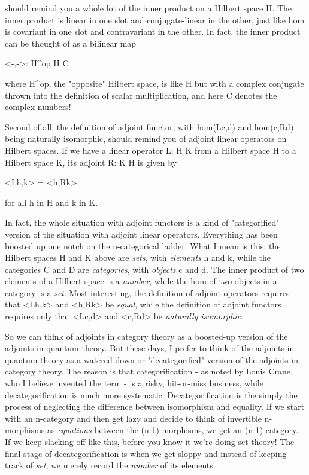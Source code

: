 should remind you a whole lot of the inner product on a Hilbert space
H.  The inner product is linear in one slot and conjugate-linear in the
other, just like hom is covariant in one slot and contravariant in the other.
In fact, the inner product can be thought of as a bilinear map

<-,->: H^{op} \times  H \to  C

where H^{op}, the "opposite" Hilbert space, is like H 
but with a complex
conjugate thrown into the definition of scalar multiplication, and here
C denotes the complex numbers!

Second of all, the definition of adjoint functor, with hom(Lc,d) and
hom(c,Rd) being naturally isomorphic, should remind you of adjoint linear
operators on Hilbert spaces.  If we have a linear operator L: H \to  K from
a Hilbert space H to a Hilbert space K, its adjoint R: K \to  H is given
by

<Lh,k> = <h,Rk>

for all h in H and k in K.  

In fact, the whole situation with adjoint functors is a kind of
"categorified" version of the situation with adjoint linear
operators.  Everything has been boosted up one notch on the
n-categorical ladder.  What I mean is this: the Hilbert spaces H and K
above are \emph{sets}, with \emph{elements} h and k, while the
categories C and D are \emph{categories}, with \emph{objects} c and
d.  The inner product of two elements of a Hilbert space is a
\emph{number}, while the hom of two objects in a category is a
\emph{set}.  Most interesting, the definition of adjoint operators
requires that <Lh,k> and <h,Rk> be \emph{equal}, while the
definition of adjoint functors requires only that <Lc,d> and
<c,Rd> be \emph{naturally isomorphic}.

So we can think of adjoints in category theory as a boosted-up version
of the adjoints in quantum theory.  But these days, I prefer to think
of the adjoints in quantum theory as a watered-down or
"decategorified" version of the adjoints in category theory.
The reason is that categorification - as noted by Louis Crane, who I
believe invented the term - is a risky, hit-or-miss business, while
decategorification is much more systematic.  Decategorification is the
simply the process of neglecting the difference between isomorphism
and equality.  If we start with an n-category and then get lazy and
decide to think of invertible n-morphisms as \emph{equations}
between the (n-1)-morphisms, we get an (n-1)-category.  If we keep
slacking off like this, before you know it we're doing set theory!
The final stage of decategorification is when we get sloppy and
instead of keeping track of \emph{set}, we merely record the
\emph{number} of its elements.

